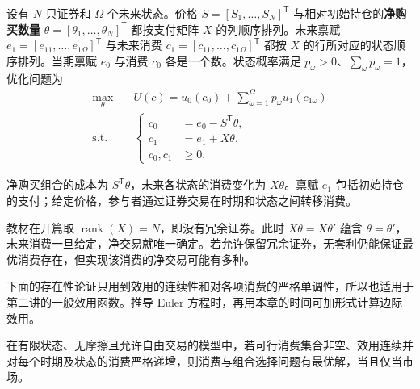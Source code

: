 \begin{tcolorbox}[knowledge,title=消费与投资的联合选择]
设有 $N$ 只证券和 $\Omega$ 个未来状态。价格 $S=[S_1,\ldots,S_N]^{\mathsf T}$ 与相对初始持仓的\textbf{净购买数量} $\theta=[\theta_1,\ldots,\theta_N]^{\mathsf T}$ 都按支付矩阵 $X$ 的列顺序排列。未来禀赋 $e_1=[e_{11},\ldots,e_{1\Omega}]^{\mathsf T}$ 与未来消费 $c_1=[c_{11},\ldots,c_{1\Omega}]^{\mathsf T}$ 都按 $X$ 的行所对应的状态顺序排列。当期禀赋 $e_0$ 与消费 $c_0$ 各是一个数。状态概率满足 $p_\omega>0$、$\sum_\omega p_\omega=1$，优化问题为
\begin{equation}
\begin{aligned}
 \max_\theta\quad &U(c)=u_0(c_0)+\sum_{\omega=1}^{\Omega}p_\omega u_1(c_{1\omega})\\
 \text{s.t.}\quad &
 \left\{\begin{aligned}
 c_0&=e_0-S^{\mathsf T}\theta,\\
 c_1&=e_1+X\theta,\\
 c_0,c_1&\ge0.
 \end{aligned}\right.
\end{aligned}\label{eq:wj-8-1}
\end{equation}
\end{tcolorbox}

净购买组合的成本为 $S^{\mathsf T}\theta$，未来各状态的消费变化为 $X\theta$。禀赋 $e_1$ 包括初始持仓的支付；给定价格，参与者通过证券交易在时期和状态之间转移消费。

教材在开篇取 $\operatorname{rank}(X)=N$，即没有冗余证券。此时 $X\theta=X\theta'$ 蕴含 $\theta=\theta'$，未来消费一旦给定，净交易就唯一确定。若允许保留冗余证券，无套利仍能保证最优消费存在，但实现该消费的净交易可能有多种。

下面的存在性论证只用到效用的连续性和对各项消费的严格单调性，所以也适用于第二讲的一般效用函数。推导 Euler 方程时，再用本章的时间可加形式计算边际效用。

\begin{tcolorbox}[knowledge]
 在有限状态、无摩擦且允许自由交易的模型中，若可行消费集合非空、效用连续并对每个时期及状态的消费严格递增，则消费与组合选择问题有最优解，当且仅当市场。
\end{tcolorbox}

